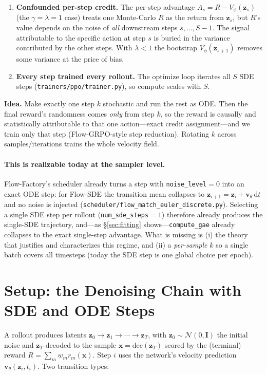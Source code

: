 \documentclass[11pt]{article}
\theoremstyle{plain}
\theoremstyle{remark}
\newcommand{\zt}{\bm{z}}
\newcommand{\Vphi}{V_\phi}
\begin{document}
\begin{enumerate}[leftmargin=1.5em]
  \item \textbf{Confounded per-step credit.} The per-step advantage $A_s=R-\Vphi(\zt_s)$
  (the $\gamma{=}\lambda{=}1$ case) treats one Monte-Carlo $R$ as the return from
  $\zt_s$, but $R$'s value depends on the noise of \emph{all} downstream steps
  $s,\dots,S-1$. The signal attributable to the specific action at step $s$ is buried in
  the variance contributed by the other steps. With $\lambda<1$ the bootstrap
  $\Vphi(\zt_{s+1})$ removes some variance at the price of bias.
  \item \textbf{Every step trained every rollout.} The optimize loop iterates all $S$
  SDE steps (\texttt{trainers/ppo/trainer.py}), so compute scales with $S$.
\end{enumerate}

\textbf{Idea.} Make exactly one step $k$ stochastic and run the rest as ODE. Then the
final reward's randomness comes \emph{only} from step $k$, so the reward is causally and
statistically attributable to that one action---exact credit assignment---and we train
only that step (Flow-GRPO-style step reduction). Rotating $k$ across samples/iterations
trains the whole velocity field.

\paragraph{This is realizable today at the sampler level.} Flow-Factory's scheduler
already turns a step with \texttt{noise\_level}${=}0$ into an exact ODE step: for
Flow-SDE the transition mean collapses to $\zt_{i+1}=\zt_i+\bm v_\theta\,\mathrm dt$ and
no noise is injected (\texttt{scheduler/flow\_match\_euler\_discrete.py}). Selecting a
single SDE step per rollout (\texttt{num\_sde\_steps}${=}1$) therefore already produces
the single-SDE trajectory, and---as \S\ref{sec:fitting} shows---\texttt{compute\_gae}
already collapses to the exact single-step advantage. What is missing is (i) the theory
that justifies and characterizes this regime, and (ii) a \emph{per-sample} $k$ so a
single batch covers all timesteps (today the SDE step is one global choice per epoch).

\section{Setup: the Denoising Chain with SDE and ODE Steps}
\label{sec:setup}

A rollout produces latents $\zt_0\to\zt_1\to\cdots\to\zt_T$, with $\zt_0\sim\mathcal
N(0,\bm I)$ the initial noise and $\zt_T$ decoded to the sample $\bm x=\mathrm{dec}(\zt_T)$
scored by the (terminal) reward $R=\sum_m w_m r_m(\bm x)$. Step $i$ uses the network's
velocity prediction $\bm v_\theta(\zt_i,t_i)$. Two transition types:
\end{document}
